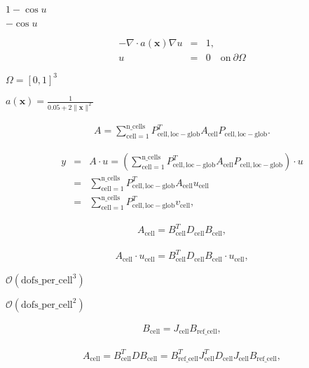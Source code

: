 \documentclass{article}
\begin{document}
$1-\cos u$
\pagebreak

$-\cos u$
\pagebreak

\begin{eqnarray*} - \nabla \cdot a(\mathbf x) \nabla u &=& 1, \\ u &=& 0 \quad \text{on}\ \partial \Omega \end{eqnarray*}
\pagebreak

$\Omega=[0,1]^3$
\pagebreak

$a(\mathbf x)=\frac{1}{0.05 + 2\|\mathbf x\|^2}$
\pagebreak

\begin{eqnarray*} A = \sum_{\mathrm{cell}=1}^{\mathrm{n\_cells}} P_{\mathrm{cell,{loc-glob}}}^T A_{\mathrm{cell}} P_{\mathrm{cell,{loc-glob}}}. \end{eqnarray*}
\pagebreak

\begin{eqnarray*} y &=& A\cdot u = \left(\sum_{\text{cell}=1}^{\mathrm{n\_cells}} P_\mathrm{cell,{loc-glob}}^T A_\mathrm{cell} P_\mathrm{cell,{loc-glob}}\right) \cdot u \\ &=& \sum_{\mathrm{cell}=1}^{\mathrm{n\_cells}} P_\mathrm{cell,{loc-glob}}^T A_\mathrm{cell} u_\mathrm{cell} \\ &=& \sum_{\mathrm{cell}=1}^{\mathrm{n\_cells}} P_\mathrm{cell,{loc-glob}}^T v_\mathrm{cell}, \end{eqnarray*}
\pagebreak

\begin{eqnarray*} A_\mathrm{cell} = B_\mathrm{cell}^T D_\mathrm{cell} B_\mathrm{cell}, \end{eqnarray*}
\pagebreak

\begin{eqnarray*} A_\mathrm{cell}\cdot u_\mathrm{cell} = B_\mathrm{cell}^T D_\mathrm{cell} B_\mathrm{cell} \cdot u_\mathrm{cell}, \end{eqnarray*}
\pagebreak

$\mathcal {O}(\mathrm{dofs\_per\_cell}^3)$
\pagebreak

$\mathcal {O}(\mathrm{dofs\_per\_cell}^2)$
\pagebreak

\begin{eqnarray*} B_\mathrm{cell} = J_\mathrm{cell} B_\mathrm{ref\_cell}, \end{eqnarray*}
\pagebreak

\begin{eqnarray*} A_\mathrm{cell} = B_\mathrm{cell}^T D B_\mathrm{cell} = B_\mathrm{ref\_cell}^T J_\mathrm{cell}^T D_\mathrm{cell} J_\mathrm{cell} B_\mathrm{ref\_cell}, \end{eqnarray*}
\pagebreak
\end{document}
